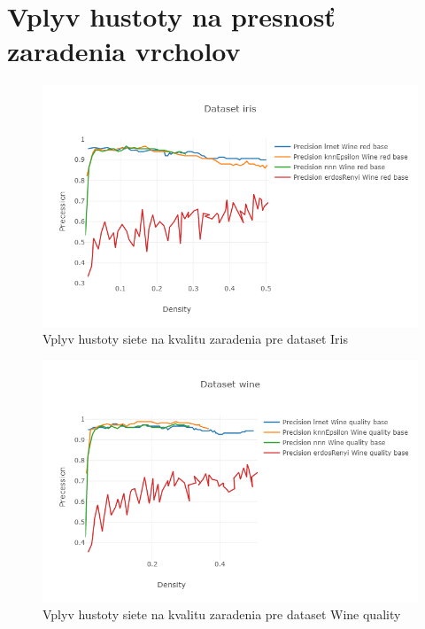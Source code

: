 \documentclass[slovak,master,dept460,male,cpp,cpdeclaration]{diploma}
\begin{document}
\printbibliography[title={Literatura}, heading=bibintoc]

\appendix
\section{Vplyv hustoty na presnosť zaradenia vrcholov}

\begin{figure}[H]
\centering
    \includegraphics[width=\textwidth]{plot_iris.png}
    \caption{Vplyv hustoty siete na kvalitu zaradenia pre dataset Iris}
\end{figure} 
\begin{figure}[H]
\centering
    \includegraphics[width=\textwidth]{plot_wine.png}
    \caption{Vplyv hustoty siete na kvalitu zaradenia pre dataset Wine quality}
\end{figure} 
\end{document}
